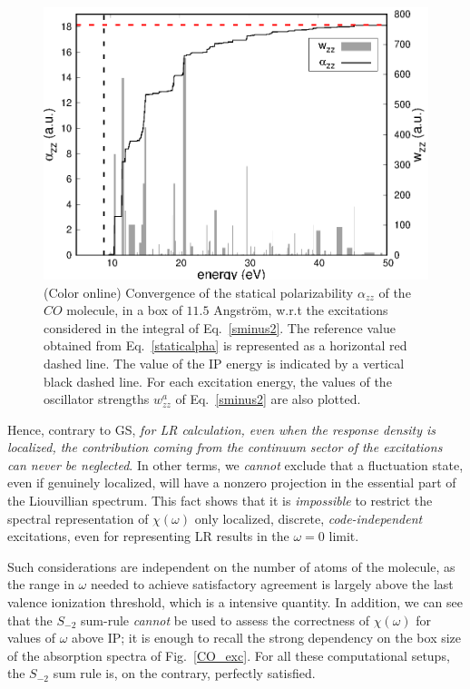 \documentclass[reprint,aps,prb]{revtex4-1}
\renewcommand{\AA}{{Angstr\"om}}
\begin{document}
\begin{figure}
\includegraphics[scale=0.6]{Fig6_CO_statPolvsExc.eps}
\caption{\label{co_AlphaExc}(Color online) Convergence of the statical polarizability $\alpha_{zz}$ of the $CO$ molecule, in a box of $11.5$ \AA,
w.r.t the excitations considered in the integral of Eq.~\eqref{sminus2}. The reference value obtained from Eq.~\eqref{staticalpha} is represented as a
horizontal red dashed line. The value of the IP energy is indicated by a vertical black dashed line. For each excitation energy, the values of the
oscillator strengths $w^a_{zz}$ of Eq.~\eqref{sminus2} are also plotted. }
\end{figure}
Hence, contrary to GS, \emph{for LR calculation,
even when the response density is localized, the contribution coming from the
continuum sector of the excitations can never be neglected}.
In other terms, we \emph{cannot} exclude that a fluctuation state, even if genuinely localized, will have a nonzero projection
in the essential part of the Liouvillian spectrum.
This fact shows that it is \emph{impossible} to restrict the spectral representation
of $\chi(\omega)$ only localized, discrete, \emph{code-independent} excitations, even for representing LR results in the $\omega=0$ limit.

Such considerations are independent on the number of atoms of the molecule, as the range in $\omega$ needed to
achieve satisfactory agreement is largely above the last valence ionization threshold, which is
a intensive quantity.
In addition, we can see that the $S_{-2}$ sum-rule \emph{cannot} be used to assess
the correctness of $\chi(\omega)$ for values of $\omega$ above IP; it is enough to recall
the strong dependency on the box size of the absorption spectra of Fig.~\ref{CO_exc}.
For all these computational setups, the $S_{-2}$ sum rule is, on the contrary, perfectly satisfied.
\end{document}
